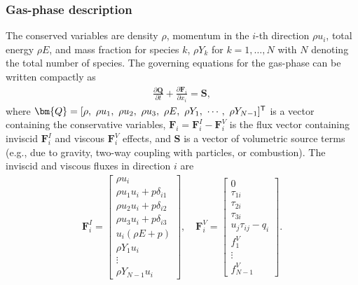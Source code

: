 \documentclass[12pt]{article}
\newcommand{\tr}{{\sf T}} %
\begin{document}
\subsubsection{Gas-phase description \label{sec:gas}}
The conserved variables are density $\rho$, momentum in the $i$-th direction $\rho u_i$, total energy $\rho E$, and mass fraction for species $k$, $\rho Y_k$ for $k=1,\ldots,N$ with $N$ denoting the total number of species.
The governing equations for the gas-phase can be written compactly as
\begin{align}\label{eq:compact_N_S}
\frac{\partial \bm{Q}}{\partial t}+\frac{\partial \bm{F}_i}{\partial x_i}=\bm{S},
\end{align}
where $\bm{Q}=[\rho, \ \rho u_1, \ \rho u_2, \ \rho u_3, \ \rho E, \ \rho Y_1, \ \cdots, \  \rho Y_{N-1}]^\tr$ is a vector containing the conservative variables, $\bm{F}_i = \bm{F}^I_i - \textbf{F}^V_i$ is the flux vector containing inviscid $\bm{F}^I_i$ and viscous $\bm{F}^V_i$ effects, and $\bm{S}$ is a vector of volumetric source terms (e.g., due to gravity, two-way coupling with particles, or combustion). The inviscid and viscous fluxes in direction $i$ are
\begin{align}\label{F_S_1}
\bm{F}^I_i=\begin{bmatrix}
\rho u_i \\
\rho u_1 u_i + p \delta_{i1} \\
\rho u_2 u_i + p \delta_{i2} \\
\rho u_3 u_i + p \delta_{i3} \\
u_i(\rho E + p ) \\
\rho Y_1 u_i\\
\vdots\\
\rho Y_{N-1} u_i
\end{bmatrix},
\quad \bm{F}^V_i=\begin{bmatrix}
0 \\
\tau_{1i} \\
\tau_{2i} \\
\tau_{3i} \\
u_j \tau_{ij} - q_i \\
f^V_1\\
\vdots\\
f^V_{N-1}
\end{bmatrix}.
\end{align}
\end{document}
